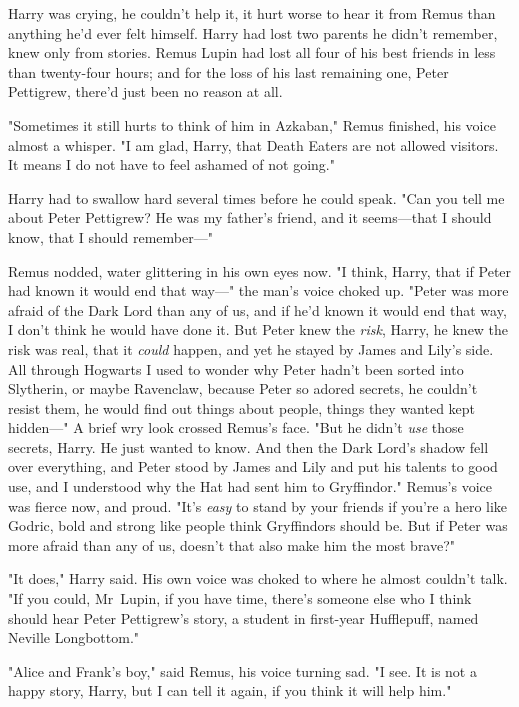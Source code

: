 Harry was crying, he couldn't help it, it hurt worse to hear it from Remus than
anything he'd ever felt himself. Harry had lost two parents he didn't remember,
knew only from stories. Remus Lupin had lost all four of his best friends in
less than twenty-four hours; and for the loss of his last remaining one, Peter
Pettigrew, there'd just been no reason at all.

"Sometimes it still hurts to think of him in Azkaban," Remus finished, his
voice almost a whisper. "I am glad, Harry, that Death Eaters are not allowed
visitors. It means I do not have to feel ashamed of not going."

Harry had to swallow hard several times before he could speak. "Can you tell me
about Peter Pettigrew? He was my father's friend, and it seems---that I should
know, that I should remember---"

Remus nodded, water glittering in his own eyes now. "I think, Harry, that if
Peter had known it would end that way---" the man's voice choked up. "Peter was
more afraid of the Dark Lord than any of us, and if he'd known it would end
that way, I don't think he would have done it. But Peter knew the \emph{risk},
Harry, he knew the risk was real, that it \emph{could} happen, and yet he
stayed by James and Lily's side. All through Hogwarts I used to wonder why
Peter hadn't been sorted into Slytherin, or maybe Ravenclaw, because Peter so
adored secrets, he couldn't resist them, he would find out things about people,
things they wanted kept hidden---" A brief wry look crossed Remus's face. "But
he didn't \emph{use} those secrets, Harry. He just wanted to know. And then the
Dark Lord's shadow fell over everything, and Peter stood by James and Lily and
put his talents to good use, and I understood why the Hat had sent him to
Gryffindor." Remus's voice was fierce now, and proud. "It's \emph{easy} to
stand by your friends if you're a hero like Godric, bold and strong like people
think Gryffindors should be. But if Peter was more afraid than any of us,
doesn't that also make him the most brave?"

"It does," Harry said. His own voice was choked to where he almost couldn't
talk. "If you could, Mr~Lupin, if you have time, there's someone else who I
think should hear Peter Pettigrew's story, a student in first-year Hufflepuff,
named Neville Longbottom."

"Alice and Frank's boy," said Remus, his voice turning sad. "I see. It is not a
happy story, Harry, but I can tell it again, if you think it will help him."

